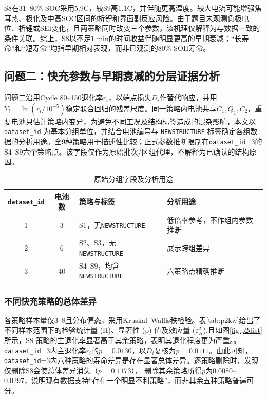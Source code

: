 \documentclass[withoutpreface]{cumcmthesis}
\begin{document}
S8在31--80\% SOC采用5.9C，较S9高1.1C，并伴随更高温度。较大电流可能增强焦耳热、极化及中高SOC区间的析锂和界面副反应风险\cite{koehler2019,operando2022}。由于题目未观测负极电位、析锂或SEI变化，且两策略同时改变三个参数，该机理仅解释为与数据一致的条件关联。综上，S8以不足1 min的时间收益伴随明显更高的早期衰减；“长寿命”和“短寿命”均指早期相对表现，而非已观测的80\% SOH寿命。
\FloatBarrier


\subsection{问题二：快充参数与早期衰减的分层证据分析}
问题二沿用Cycle 80--150退化率$r_i$，以端点损失$D_i$作替代响应，并用$Y_i=\ln(r_i/10^{-5})$稳定联合回归的残差尺度。同一策略内电池共享$C_1,Q_1,C_2$，重复电池只估计策略内变异，为避免不同工况及结构标签造成的混杂影响，本文以 \texttt{dataset\_id} 为基本分组单位，并结合电池编号与 \texttt{NEWSTRUCTURE} 标签确定各组数据的分析用途。全9种策略用于描述性比较；正式参数推断限制在\texttt{dataset\_id}=3的S4--S9六个策略点。该字段仅作为原始批次/区组代理，不解释为已确认的结构原因。

\begin{table}[htbp]
\centering
\caption{原始分组字段及分析用途}
\label{tab:dataset-source}
\small
\renewcommand{\arraystretch}{1.25}
\setlength{\tabcolsep}{6pt}

\begin{tabularx}{\textwidth}{ccp{5.2cm}X}
\toprule
\texttt{dataset\_id} & 电池数 & 策略与标签 & 分析用途\\
\midrule

1 & 3 & S1，无\texttt{NEWSTRUCTURE}
& 低倍率参考，不作组内参数推断\\

2 & 6 & S2、S3，无\texttt{NEWSTRUCTURE}
& 展示跨组差异\\

3 & 40 & S4--S9，均含\texttt{NEWSTRUCTURE}
& 六策略点精确推断\\

\bottomrule
\end{tabularx}
\end{table}



\subsubsection{不同快充策略的总体差异}
各策略样本量仅3--8且分布偏态，采用Kruskal--Wallis秩检验。表\ref{tab:p2kw}给出了不同样本范围下的检验统计量 (H)、显著性 (p) 值及效应量 ($\varepsilon_H^2$),且如图\ref{fig:p2dist}所示，S8 策略的主退化率显著高于其余策略，表明其退化程度更为严重。。\texttt{dataset\_id}=3内主退化率$r_i$的$p=0.0130$，以$D_i$复核为$p=0.0111$。由此可知，\texttt{dataset\_id}=3内六种策略的寿命差异是存在显著总体差异。逐策略删除时，发现仅删除S8会使总体差异消失（$p=0.1173$），
删除其余策略所得$p$为0.0080--0.0297，说明现有数据支持“存在一个明显不利策略”，而非其余五种策略普遍可分。
\end{document}

